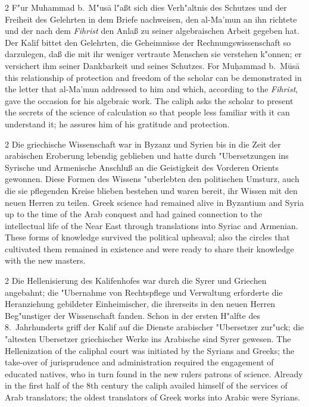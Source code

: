\documentclass[10pt,a4paper]{article}
\renewcommand{\switchcolumn}{\syncronize\nointerlineskip\columnbreak}
\begin{document}
\begin{paracol}{2}
F"ur Muhammad b.\ M"us\=a l"a\ss{}t sich dies Verh"altnis des Schutzes und der Freiheit des Gelehrten in dem Briefe nachweisen, den al-Ma'mun an ihn richtete und der nach dem \textit{Fihrist} den Anla\ss{} zu seiner algebraischen Arbeit gegeben hat. Der Kalif bittet den Gelehrten, die Geheimnisse der Rechnungswissenschaft so darzulegen, da\ss{} die mit ihr weniger vertraute Menschen sie verstehen k"onnen; er versichert ihm seiner Dankbarkeit und seines Schutzes.
\switchcolumn
For Mu\d{h}ammad b.\ M\=us\=a this relationship of protection and freedom of the scholar can be demonstrated in the letter that al-Ma'mun addressed to him and which, according to the \textit{Fihrist}, gave the occasion for his algebraic work. The caliph asks the scholar to present the secrets of the science of calculation so that people less familiar with it can understand it; he assures him of his gratitude and protection.
\end{paracol}

\begin{paracol}{2}
Die griechische Wissenschaft war in Byzanz und Syrien bis in die Zeit der arabischen Eroberung lebendig geblieben und hatte durch "Ubersetzungen ins Syrische und Armenische Anschlu\ss{} an die Geistigkeit des Vorderen Orients gewonnen. Diese Formen des Wissens "uberlebten den politischen Umsturz, auch die sie pflegenden Kreise blieben bestehen und waren bereit, ihr Wissen mit den neuen Herren zu teilen.
\switchcolumn
Greek science had remained alive in Byzantium and Syria up to the time of the Arab conquest and had gained connection to the intellectual life of the Near East through translations into Syriac and Armenian. These forms of knowledge survived the political upheaval; also the circles that cultivated them remained in existence and were ready to share their knowledge with the new masters.
\end{paracol}

\begin{paracol}{2}
Die Hellenisierung des Kalifenhofes war durch die Syrer und Griechen angebahnt; die "Ubernahme von Rechtspflege und Verwaltung erforderte die Heranziehung gebildeter Einheimischer, die ihrerseits in den neuen Herren Beg"unstiger der Wissenschaft fanden. Schon in der ersten H"alfte des 8.\ Jahrhunderts griff der Kalif auf die Dienste arabischer "Ubersetzer zur"uck; die "altesten Ubersetzer griechischer Werke ins Arabische sind Syrer gewesen.
\switchcolumn
The Hellenization of the caliphal court was initiated by the Syrians and Greeks; the take-over of jurisprudence and administration required the engagement of educated natives, who in turn found in the new rulers patrons of science. Already in the first half of the 8th century the caliph availed himself of the services of Arab translators; the oldest translators of Greek works into Arabic were Syrians.
\end{paracol}
\end{document}
